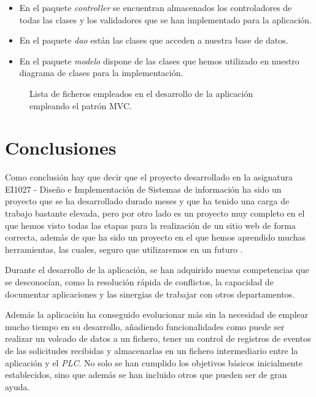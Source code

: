 \documentclass[pdftex,11pt,a4paper]{book}
\begin{document}
\begin{itemize}
\item En el paquete \emph{controller} se encuentran almacenados los controladores de todas las clases y los validadores que se han implementado para la aplicación.
\item En el paquete \emph{dao} están las clases que acceden a nuestra base de datos.
\item En el paquete \emph{modelo} dispone de las clases que hemos utilizado en nuestro diagrama de clases para la implementación.
\end{itemize}


\begin{figure}[h]
\begin{center}
\caption{\label{arbol} Lista de ficheros empleados en el desarrollo de la aplicación empleando el patrón MVC.}
\end{center}
\end{figure}

\chapter{Conclusiones} 
Como conclusión hay que decir que el proyecto desarrollado en la asignatura EI1027 - Diseño e Implementación de Sistemas de información ha sido un proyecto que se ha desarrollado durado meses y que ha tenido una carga de trabajo bastante elevada, pero por otro lado es un proyecto muy completo en el que hemos visto todas las etapas para la realización de un sitio web de forma correcta, además de que ha sido un proyecto en el que hemos aprendido muchas herramientas, las cuales, seguro que utilizaremos en un futuro .



Durante el desarrollo de la aplicación, se han adquirido nuevas competencias que se desconocían, como la resolución rápida de conflictos, la capacidad de documentar aplicaciones y las sinergias de trabajar con otros departamentos.

Además la aplicación ha conseguido evolucionar más sin la necesidad de emplear mucho tiempo en su desarrollo, añadiendo funcionalidades como puede ser realizar un volcado de datos a un fichero, tener un control de registros de eventos de las solicitudes recibidas y almacenarlas en un fichero intermediario entre la aplicación y el \emph{PLC}. No solo se han cumplido los objetivos básicos inicialmente establecidos, sino que además se han incluido otros que pueden ser de gran ayuda.
\end{document}
